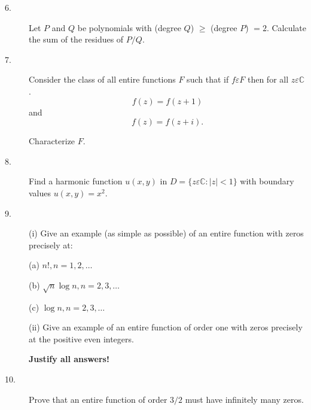 \documentclass{article}
\def\C{\mathbb C}
\begin{document}
\begin{description}
\item[6.]
Let $P$ and $Q$ be polynomials with (degree $Q$) $\geq$ (degree $P$) $=2$.
Calculate the sum of the residues of $P/Q$.

\item[7.]
Consider the class of all entire functions $F$ such that if $f \varepsilon F$
then for all $z \varepsilon \C$.
$$f(z) = f(z+1)$$
and
$$f(z) = f(z+i).$$

Characterize $F$.

\item[8.]
Find a harmonic function $u(x,y)$ in $D = \{z \varepsilon \C : |z| < 1\}$
with boundary values $u(x,y) = x^2$.

\item[9.] (i)
Give an example (as simple as possible) of an entire function with zeros
precisely at:

\item[\qquad] (a)
$n!, n = 1,2, \dots$

\item[\qquad] (b)
$\sqrt{n} \log n, n = 2,3, \dots$

\item[\qquad] (c)
$\log n, n = 2,3, \dots$

\item[\quad] (ii)
Give an example of an entire function of order one with zeros precisely
at the positive even integers.

{\bf Justify all answers!}

\item[10.]
Prove that an entire function of order $3/2$ must have infinitely many zeros.





\end{description}    
\end{document}
